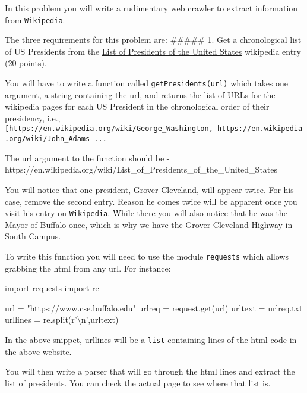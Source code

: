 \documentclass[11pt]{article}
\newenvironment{Shaded}{}{}
\newcommand{\StringTok}[1]{\textcolor[rgb]{0.25,0.44,0.63}{{#1}}}
\newcommand{\NormalTok}[1]{{#1}}
\newcommand{\VerbatimStringTok}[1]{\textcolor[rgb]{0.25,0.44,0.63}{{#1}}}
\newcommand{\ImportTok}[1]{{#1}}
\newcommand{\OperatorTok}[1]{\textcolor[rgb]{0.40,0.40,0.40}{{#1}}}
\begin{document}
In this problem you will write a rudimentary web crawler to extract
information from \texttt{Wikipedia}.

The three requirements for this problem are: \#\#\#\#\# 1. Get a
chronological list of US Presidents from the
\href{https://en.wikipedia.org/wiki/List_of_Presidents_of_the_United_States}{List
of Presidents of the United States} wikipedia entry (20 points).

You will have to write a function called \texttt{getPresidents(url)}
which takes one argument, a string containing the url, and returns the
list of URLs for the wikipedia pages for each US President in the
chronological order of their presidency, i.e.,
\texttt{{[}\textquotesingle{}https://en.wikipedia.org/wiki/George\_Washington\textquotesingle{},\ \textquotesingle{}https://en.wikipedia.org/wiki/John\_Adams\textquotesingle{}{]}\ ...}

The url argument to the function should be -
https://en.wikipedia.org/wiki/List\_of\_Presidents\_of\_the\_United\_States

You will notice that one president, Grover Cleveland, will appear twice.
For his case, remove the second entry. Reason he comes twice will be
apparent once you visit his entry on \texttt{Wikipedia}. While there you
will also notice that he was the Mayor of Buffalo once, which is why we
have the Grover Cleveland Highway in South Campus.

To write this function you will need to use the module \texttt{requests}
which allows grabbing the html from any url. For instance:

\begin{Shaded}
\begin{Highlighting}[]
\ImportTok{import}\NormalTok{ requests}
\ImportTok{import}\NormalTok{ re}

\NormalTok{url }\OperatorTok{=} \StringTok{"https://www.cse.buffalo.edu"}
\NormalTok{urlreq }\OperatorTok{=}\NormalTok{ request.get(url)}
\NormalTok{urltext }\OperatorTok{=}\NormalTok{ urlreq.txt}
\NormalTok{urllines }\OperatorTok{=}\NormalTok{ re.split(}\VerbatimStringTok{r'\textbackslash{}n'}\NormalTok{,urltext)}
\end{Highlighting}
\end{Shaded}

In the above snippet, urllines will be a \texttt{list} containing lines
of the html code in the above website.

You will then write a parser that will go through the html lines and
extract the list of presidents. You can check the actual page to see
where that list is.
\end{document}
